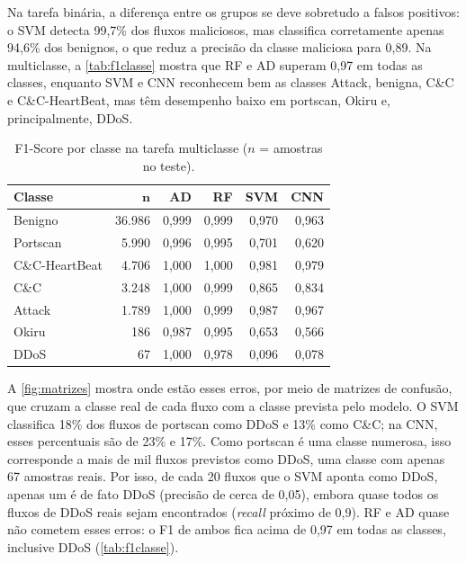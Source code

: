 \documentclass[alpha-refs,brazilian]{CC-EC_TF-TC}
\begin{document}
Na tarefa binária, a diferença entre os grupos se deve sobretudo a falsos positivos: o SVM detecta 99,7\% dos fluxos maliciosos, mas classifica corretamente apenas 94,6\% dos benignos, o que reduz a precisão da classe maliciosa para 0,89. Na multiclasse, a \autoref{tab:f1classe} mostra que RF e AD superam 0,97 em todas as classes, enquanto SVM e CNN reconhecem bem as classes Attack, benigna, C\&C e C\&C-HeartBeat, mas têm desempenho baixo em portscan, Okiru e, principalmente, DDoS.

\begin{table}[htbp]
\centering
\caption{F1-Score por classe na tarefa multiclasse ($n$ = amostras no teste).}
\label{tab:f1classe}
\small
\setlength{\tabcolsep}{4pt}
\begin{tabular}{lrrrrr}
\toprule
\textbf{Classe} & $\boldsymbol{n}$ & \textbf{AD} & \textbf{RF} & \textbf{SVM} & \textbf{CNN} \\
\midrule
Benigno        & 36.986 & 0,999 & 0,999 & 0,970 & 0,963 \\
Portscan       &  5.990 & 0,996 & 0,995 & 0,701 & 0,620 \\
C\&C-HeartBeat &  4.706 & 1,000 & 1,000 & 0,981 & 0,979 \\
C\&C           &  3.248 & 1,000 & 0,999 & 0,865 & 0,834 \\
Attack         &  1.789 & 1,000 & 0,999 & 0,987 & 0,967 \\
Okiru          &    186 & 0,987 & 0,995 & 0,653 & 0,566 \\
DDoS           &     67 & 1,000 & 0,978 & 0,096 & 0,078 \\
\bottomrule
\end{tabular}
\end{table}

A \autoref{fig:matrizes} mostra onde estão esses erros, por meio de matrizes de confusão, que cruzam a classe real de cada fluxo com a classe prevista pelo modelo. O SVM classifica 18\% dos fluxos de portscan como DDoS e 13\% como C\&C; na CNN, esses percentuais são de 23\% e 17\%. Como portscan é uma classe numerosa, isso corresponde a mais de mil fluxos previstos como DDoS, uma classe com apenas 67 amostras reais. Por isso, de cada 20 fluxos que o SVM aponta como DDoS, apenas um é de fato DDoS (precisão de cerca de 0,05), embora quase todos os fluxos de DDoS reais sejam encontrados (\textit{recall} próximo de 0,9). RF e AD quase não cometem esses erros: o F1 de ambos fica acima de 0,97 em todas as classes, inclusive DDoS (\autoref{tab:f1classe}).
\end{document}
